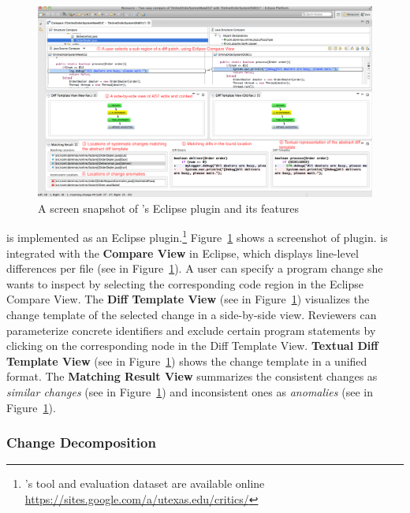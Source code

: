 \documentclass[runningheads,a4paper]{llncs}
\begin{document}
\begin{figure}[ht]
 \centering
 \includegraphics[width=\textwidth]{images/critics-UI.pdf}
 \caption{A screen snapshot of {\critics}'s Eclipse plugin and its features}
 \label{fig:critics-UI}
\end{figure}

{\critics} is implemented as an Eclipse plugin.\footnote{{\critics}'s tool and evaluation dataset are available online \url{https://sites.google.com/a/utexas.edu/critics/}} Figure~\ref{fig:critics-UI} shows a screenshot of {\critics} plugin. {\critics} is integrated with the {\bf Compare View} in Eclipse, which displays line-level differences per file (see  in Figure~\ref{fig:critics-UI}). A user can specify a program change she wants to inspect by selecting the corresponding code region in the Eclipse Compare View. The {\bf Diff Template View} (see  in Figure~\ref{fig:critics-UI}) visualizes the change template of the selected change in a side-by-side view. Reviewers can parameterize concrete identifiers and exclude certain program statements by clicking on the corresponding node in the Diff Template View. {\bf Textual Diff Template View} (see  in Figure~\ref{fig:critics-UI}) shows the change template in a unified format. The {\bf Matching Result View} summarizes the consistent changes as {\em similar changes} (see  in Figure~\ref{fig:critics-UI}) and inconsistent ones as {\em anomalies} (see  in Figure~\ref{fig:critics-UI}).


\subsubsection{Change Decomposition} 
 
\end{document}
